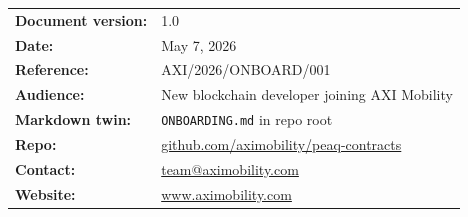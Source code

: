 \documentclass[11pt,a4paper]{article}
\begin{document}
\begin{tabular}{p{4.5cm} p{11.5cm}}
\textbf{\color{axiprimary}Document version:} & 1.0 \\
\textbf{\color{axiprimary}Date:} & May 7, 2026 \\
\textbf{\color{axiprimary}Reference:} & AXI/2026/ONBOARD/001 \\
\textbf{\color{axiprimary}Audience:} & New blockchain developer joining AXI Mobility \\
\textbf{\color{axiprimary}Markdown twin:} & \texttt{ONBOARDING.md} in repo root \\
\textbf{\color{axiprimary}Repo:} & \href{https://github.com/aximobility/peaq-contracts}{github.com/aximobility/peaq-contracts} \\
\textbf{\color{axiprimary}Contact:} & \href{mailto:team@aximobility.com}{team@aximobility.com} \\
\textbf{\color{axiprimary}Website:} & \href{https://www.aximobility.com}{www.aximobility.com} \\
\end{tabular}

\vspace{0.8cm}

\begin{center}
\end{center}
\end{document}
